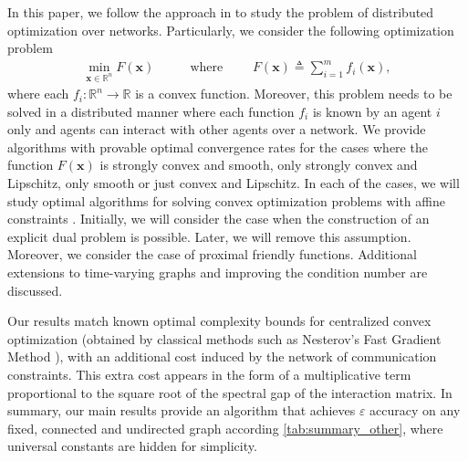 \documentclass[final]{siamart1116}
\def\xb{\mathbf{x}}
\numberwithin{theorem}{section}
\begin{document}
	In this paper, we follow the approach in \cite{sca17} to study the problem of distributed optimization over networks. Particularly, we consider the following optimization problem
	\begin{align}\label{main_problem}
	\min_{\xb \in \mathbb{R}^n} F(\xb) & \qquad \text{where } \qquad F(\xb)\triangleq \sum\limits_{i=1}^{m}f_i(\xb),
	\end{align}
	where each $f_i: \mathbb{R}^n \to \mathbb{R}$ is a convex function. Moreover, this problem needs to be solved in a distributed manner where each function $f_i$ is known by an agent $i$ only and agents can interact with other agents over a network. We provide algorithms with provable optimal convergence rates for the cases where the function $F(\xb)$ is strongly convex and smooth, only strongly convex and Lipschitz, only smooth or just convex and Lipschitz. In each of the cases, we will study optimal algorithms for solving convex optimization problems with affine constraints \cite{ani17,che16,gas17}. Initially, we will consider the case when the construction of an explicit dual problem is possible. Later, we will remove this assumption. Moreover, we consider the case of proximal friendly functions. Additional extensions to time-varying graphs and improving the condition number are discussed.
	
	Our results match known optimal complexity bounds for centralized convex optimization (obtained by classical methods such as Nesterov's Fast Gradient Method \cite{nes83}), with an additional cost induced by the network of communication constraints. This extra cost appears in the form of a multiplicative term proportional to the square root of the spectral gap of the interaction matrix. In summary, our main results provide an algorithm that achieves $\varepsilon$ accuracy on any fixed, connected and undirected graph according  \cref{tab:summary_other}, where universal constants are hidden for simplicity.
\end{document}
